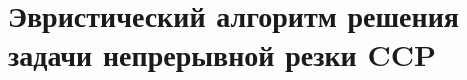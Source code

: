 
\chapter{
  Эвристический алгоритм решения
  задачи непрерывной резки
  CCP
}
\label{ch:ccp}







